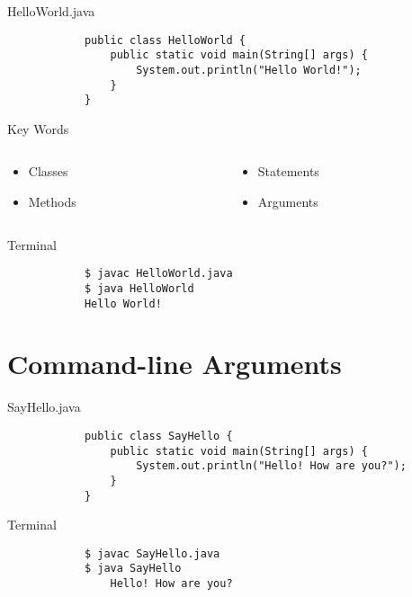 \documentclass[10pt, compress]{beamer}
\begin{document}
\begin{slide}
	\begin{block}{HelloWorld.java}
		\begin{verbatim}
			public class HelloWorld {
			    public static void main(String[] args) {
			        System.out.println("Hello World!");
			    }
			}
		\end{verbatim}
	\end{block}
	\pause
	\begin{block}{Key Words}
		\begin{columns}
		\begin{column}{0.5\textwidth}
			\begin{itemize}
				\item[] Classes
				\item[] Methods
			\end{itemize}
		\end{column}
		\begin{column}{0.5\textwidth}
			\begin{itemize}
				\item[] Statements
				\item[] Arguments
			\end{itemize}
		\end{column}
		\end{columns}
	\end{block}
\end{slide}

\begin{slide}
	\begin{block}{Terminal}
		\begin{verbatim}
			$ javac HelloWorld.java
			$ java HelloWorld
			Hello World!
		\end{verbatim}
	\end{block}
\end{slide}

\section{Command-line Arguments}

\begin{slide}
	\begin{block}{SayHello.java}
		\begin{verbatim}
			public class SayHello {
			    public static void main(String[] args) {
			        System.out.println("Hello! How are you?");
			    }
			}
		\end{verbatim}
	\end{block}
	\begin{block}{Terminal}
		\begin{verbatim}
			$ javac SayHello.java
			$ java SayHello
			    Hello! How are you?
		\end{verbatim}
	\end{block}
\end{slide}
\end{document}
